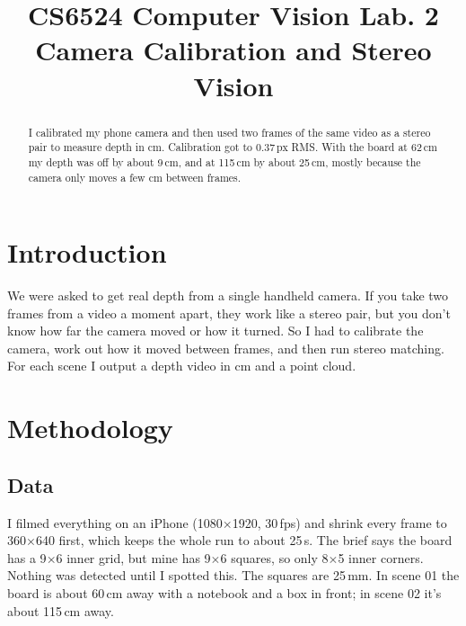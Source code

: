 \documentclass[conference]{assets/latex/IEEEtran}
\begin{document}
\title{CS6524 Computer Vision Lab. 2\\ Camera Calibration and Stereo Vision}

\author{
}

\maketitle

\begin{abstract}
I calibrated my phone camera and then used two frames of the same video as a
stereo pair to measure depth in cm. Calibration got to 0.37\,px RMS. With the
board at 62\,cm my depth was off by about 9\,cm, and at 115\,cm by about
25\,cm, mostly because the camera only moves a few cm between frames.
\end{abstract}

\section{Introduction}
We were asked to get real depth from a single handheld camera. If you take two
frames from a video a moment apart, they work like a stereo pair, but you
don't know how far the camera moved or how it turned. So I had to calibrate
the camera, work out how it moved between frames, and then run stereo
matching. For each scene I output a depth video in cm and a point cloud.

\section{Methodology}

\subsection{Data}
I filmed everything on an iPhone (1080$\times$1920, 30\,fps) and shrink every
frame to 360$\times$640 first, which keeps the whole run to about 25\,s. The
brief says the board has a 9$\times$6 inner grid, but mine has 9$\times$6
squares, so only 8$\times$5 inner corners. Nothing was detected until I
spotted this. The squares are 25\,mm. In scene 01 the board is about 60\,cm
away with a notebook and a box in front; in scene 02 it's about 115\,cm away.
\end{document}
